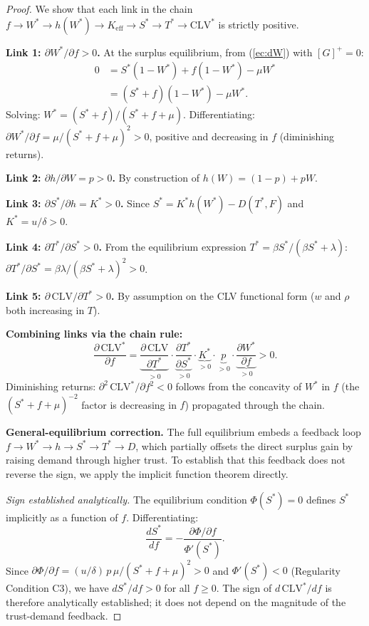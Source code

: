 \documentclass[msom,dblanonrev]{informs4}
\newcommand{\Gp}{[G]^{+}}
\newcommand{\Keff}{K_{\mathrm{eff}}}
\begin{document}
\begin{proof}
We show that each link in the chain $f \to W^* \to h(W^*) \to \Keff \to S^* \to T^* \to \mathrm{CLV}^*$ is strictly positive.

\textbf{Link 1: $\partial W^*/\partial f > 0$.} At the surplus equilibrium, from (\ref{ec:dW}) with $\Gp = 0$:
\begin{align*}
0 &= S^*(1-W^*) + f(1 - W^*) - \mu W^* \\
  &= (S^*+f)(1-W^*) - \mu W^*.
\end{align*}
Solving: $W^* = (S^* + f)/(S^* + f + \mu)$.
Differentiating: $\partial W^*/\partial f = \mu / (S^* + f + \mu)^2 > 0$, positive and decreasing in $f$ (diminishing returns).

\textbf{Link 2: $\partial h / \partial W = p > 0$.} By construction of $h(W) = (1-p) + pW$.

\textbf{Link 3: $\partial S^*/\partial h = K^* > 0$.} Since $S^* = K^* h(W^*) - D(T^*, F)$ and $K^* = u/\delta > 0$.

\textbf{Link 4: $\partial T^*/\partial S^* > 0$.} From the equilibrium expression $T^* = \beta S^* / (\beta S^* + \lambda)$: $\partial T^*/\partial S^* = \beta\lambda / (\beta S^* + \lambda)^2 > 0$.

\textbf{Link 5: $\partial\,\mathrm{CLV}/\partial T^* > 0$.} By assumption on the CLV functional form ($w$ and $\rho$ both increasing in $T$).

\textbf{Combining links via the chain rule:}
\[
\frac{\partial\,\mathrm{CLV}^*}{\partial f} = \underbrace{\frac{\partial\,\mathrm{CLV}}{\partial T^*}}_{>0} \cdot \underbrace{\frac{\partial T^*}{\partial S^*}}_{>0} \cdot \underbrace{K^*}_{>0} \cdot \underbrace{p}_{>0} \cdot \underbrace{\frac{\partial W^*}{\partial f}}_{>0} > 0.
\]
Diminishing returns: $\partial^2\,\mathrm{CLV}^*/\partial f^2 < 0$ follows from the concavity of $W^*$ in $f$ (the $(S^*+f+\mu)^{-2}$ factor is decreasing in $f$) propagated through the chain.

\textbf{General-equilibrium correction.} The full equilibrium embeds a feedback loop $f \to W^* \to h \to S^* \to T^* \to D$, which partially offsets the direct surplus gain by raising demand through higher trust. To establish that this feedback does not reverse the sign, we apply the implicit function theorem directly.

\textit{Sign established analytically.} The equilibrium condition $\Phi(S^*) = 0$ defines $S^*$ implicitly as a function of $f$. Differentiating:
\[
\frac{dS^*}{df} = -\frac{\partial\Phi/\partial f}{\Phi'(S^*)}.
\]
Since $\partial\Phi/\partial f = (u/\delta)\,p\,\mu/(S^*\!+\!f\!+\!\mu)^2 > 0$ and $\Phi'(S^*) < 0$ (Regularity Condition C3), we have $dS^*/df > 0$ for all $f \geq 0$. The sign of $d\,\mathrm{CLV}^*/df$ is therefore analytically established; it does not depend on the magnitude of the trust-demand feedback.


\end{proof}
\end{document}
